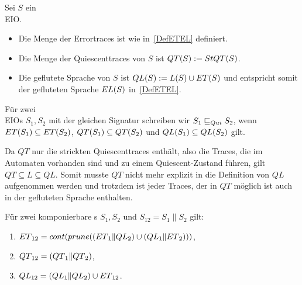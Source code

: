 \begin{Def}
  \label{DefQTQL}
  Sei $S$ ein \\EIO{}{}.
  \begin{itemize}
    \item Die Menge der Errortraces ist wie in~\ref{DefETEL} definiert.
    \item Die Menge der Quiescenttraces von $S$ ist $QT{}(S) := StQT{}(S)$.
    \item Die geflutete Sprache von $S$ ist $QL{}(S):=L(S)\cup ET{}(S)$
      und entspricht somit der gefluteten Sprache $EL{}(S)$
      in~\ref{DefETEL}.
  \end{itemize}
  Für zwei \\EIO{}{}s $S_1, S_2$ mit der gleichen Signatur schreiben wir
  $S_1\sqsubseteq _{Qui} S_2$, wenn $ET{}(S_1)\subseteq ET{}(S_2)$,
  $QT{}(S_1)\subseteq QT{}(S_2)$ und $QL{}(S_1)\subseteq QL{}(S_2)$ gilt.
\end{Def}

Da $QT$ nur die strickten Quiescenttraces enthält, also die Traces, die im
Automaten vorhanden sind und zu einem Quiescent-Zustand führen, gilt
$QT\subseteq L\subseteq QL$. Somit musste $QT$ nicht mehr explizit in die
Definition von $QL$ aufgenommen werden und trotzdem ist jeder Traces, der in
$QT$ möglich ist auch in der gefluteten Sprache enthalten.

\begin{satz}
  \label{satzQuiSemantik}
  Für zwei komponierbare \EIO{}s $S_1, S_2$ und $S_{12} = S_1\|S_2$ gilt:
  \begin{enumerate}
    \item $ET{}_{12} = cont{}(prune{}((ET{}_1\|QL{}_2)\cup (QL{}_1\|ET{}_2)))$,
    \item $QT{}_{12} = (QT{}_1\|QT{}_2)$,%
    \item $QL{}_{12} = (QL{}_1\|QL{}_2)\cup ET{}_{12}$.%
  \end{enumerate}
\end{satz}

